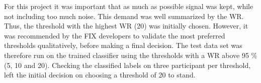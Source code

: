 For this project it was important that as much as possible signal was kept, while not including too much noise. This demand was well summarized by the WR. Thus, the threshold with the highest WR (20) was initially chosen. However, it was recommended by the FIX developers to validate the most preferred thresholds qualitatively, before making a final decision. The test data set was therefore run on the trained classifier using the thresholds with a WR above 95 \% (5, 10 and 20). Checking the classified labels on three participant per threshold, left the initial decision on choosing a threshold of 20 to stand.
